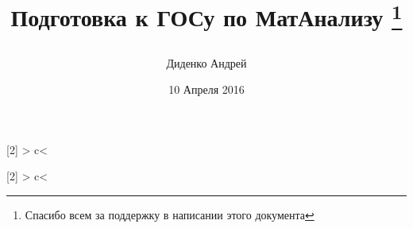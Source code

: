 \usepackage{indentfirst} 
\usepackage{amsmath,amssymb,amscd,amsthm} 				

\usepackage{blkarray}		
\usepackage{multicol}
\usepackage{multirow}		
\usepackage{array}
\usepackage{ragged2e}

\usepackage{longtable}
\setlength{\LTpre}{0pt}
\setlength{\LTpost}{0pt}

\newcolumntype{A}[2]{%
    >{\vspace\tabcolsep}%
    c<{\RaggedRight\vspace\tabcolsep\endminipage}}

\newcolumntype{B}[2]{%
    >{\vspace\tabcolsep}%
    c<{\centering\vspace\tabcolsep\endminipage}}

\usepackage{emptypage}

\usepackage{epigraph}
\usepackage[e]{esvect}		

\usepackage{datetime}

\usepackage{accents}%
     
\usepackage{forloop}

\newcommand{\boxtitle}[2]
{\setlength\fboxsep{0pt}%
\noindent\colorbox{prpl!20}{\strut\parbox[c][.6cm]{\ecart}{\color{prpl!70}\Large\sffamily\bfseries\centering#1}}\hskip\esp\colorbox{prpl!40}{\strut\parbox[c][.6cm]{\linewidth-\ecart-\esp}{\Large\sffamily\centering\bfseries#2}}}
  


\usepackage[nobottomtitles*]{titlesec}%
\renewcommand{\thesection}{\textsection\arabic{chapter}.\arabic{section}}
\renewcommand{\thesubsection}{\arabic{subsection}}

\addto\captionsrussian{\renewcommand{\chaptername}{Билет \textnumero}}
   
\setlength{\parindent}{0.6cm}

\author{Диденко Андрей}
\title{Подготовка к ГОСу по МатАнализу
\thanks{Спасибо всем за поддержку в написании этого документа}
\date{10 Апреля 2016}}
  

\usepackage{extarrows}
\usepackage{rmathbr}

\usepackage{embrac} %

